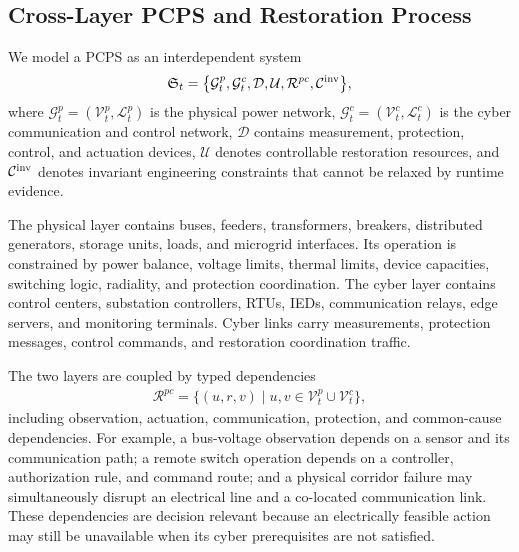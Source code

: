 \subsection{Cross-Layer PCPS and Restoration Process}
\label{subsec-cross-layer-system}
We model a PCPS as an interdependent system
\begin{align}
\label{eq-cross-layer-system}
\mathfrak{S}_t=
\big\{\mathcal{G}^{p}_t,\mathcal{G}^{c}_t,\mathcal{D},\mathcal{U},\mathcal{R}^{pc},\mathcal{C}^{\rm inv}\big\},
\end{align}
where $\mathcal{G}^{p}_t=(\mathcal{V}^{p}_t,\mathcal{L}^{p}_t)$ is the physical power network, $\mathcal{G}^{c}_t=(\mathcal{V}^{c}_t,\mathcal{L}^{c}_t)$ is the cyber communication and control network, $\mathcal{D}$ contains measurement, protection, control, and actuation devices, $\mathcal{U}$ denotes controllable restoration resources, and $\mathcal{C}^{\rm inv}$ denotes invariant engineering constraints that cannot be relaxed by runtime evidence.

The physical layer contains buses, feeders, transformers, breakers, distributed generators, storage units, loads, and microgrid interfaces. Its operation is constrained by power balance, voltage limits, thermal limits, device capacities, switching logic, radiality, and protection coordination. The cyber layer contains control centers, substation controllers, RTUs, IEDs, communication relays, edge servers, and monitoring terminals. Cyber links carry measurements, protection messages, control commands, and restoration coordination traffic.

The two layers are coupled by typed dependencies
\begin{align}
\label{eq-coupling-relation}
\mathcal{R}^{pc}=\{(u,r,v)\mid u,v\in\mathcal{V}^{p}_t\cup\mathcal{V}^{c}_t\},
\end{align}
including observation, actuation, communication, protection, and common-cause dependencies. For example, a bus-voltage observation depends on a sensor and its communication path; a remote switch operation depends on a controller, authorization rule, and command route; and a physical corridor failure may simultaneously disrupt an electrical line and a co-located communication link. These dependencies are decision relevant because an electrically feasible action may still be unavailable when its cyber prerequisites are not satisfied.

